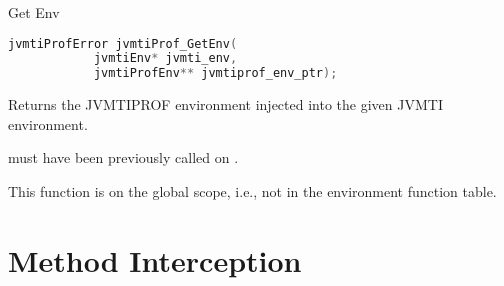 \begin{apidef}{Get Env}
\label{api:jvmtiProf_GetEnv}
\begin{lstlisting}[language=C]
jvmtiProfError jvmtiProf_GetEnv(
            jvmtiEnv* jvmti_env,
            jvmtiProfEnv** jvmtiprof_env_ptr);
\end{lstlisting}

\begin{apidesc}
Returns the JVMTIPROF environment injected into the given JVMTI environment. 

\medskip
{} must have been previously called on .

\medskip
This function is on the global scope, i.e., not in the environment function table.
\end{apidesc}

\begin{apiphase}
\apiphaseany
\end{apiphase}

\begin{apicap}
\apicaprequired
\end{apicap}

\begin{apiparam}
\end{apiparam}

\begin{apierror}
\end{apierror}
\end{apidef}

\section{Method Interception}

